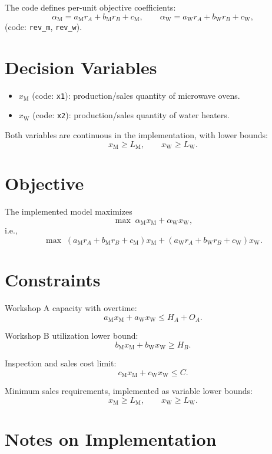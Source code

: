 The code defines per-unit objective coefficients:
\[
\alpha_{\mathrm{M}} = a_{\mathrm{M}} r_A + b_{\mathrm{M}} r_B + c_{\mathrm{M}},
\qquad
\alpha_{\mathrm{W}} = a_{\mathrm{W}} r_A + b_{\mathrm{W}} r_B + c_{\mathrm{W}},
\]
(code: \texttt{rev\_m}, \texttt{rev\_w}).

\section*{Decision Variables}

\begin{itemize}
    \item \(x_{\mathrm{M}}\) (code: \texttt{x1}): production/sales quantity of microwave ovens.
    \item \(x_{\mathrm{W}}\) (code: \texttt{x2}): production/sales quantity of water heaters.
\end{itemize}

Both variables are continuous in the implementation, with lower bounds:
\[
x_{\mathrm{M}} \ge L_{\mathrm{M}}, \qquad x_{\mathrm{W}} \ge L_{\mathrm{W}}.
\]

\section*{Objective}

The implemented model maximizes
\[
\max \; \alpha_{\mathrm{M}} x_{\mathrm{M}} + \alpha_{\mathrm{W}} x_{\mathrm{W}},
\]
i.e.,
\[
\max \; (a_{\mathrm{M}} r_A + b_{\mathrm{M}} r_B + c_{\mathrm{M}}) x_{\mathrm{M}}
      + (a_{\mathrm{W}} r_A + b_{\mathrm{W}} r_B + c_{\mathrm{W}}) x_{\mathrm{W}}.
\]

\section*{Constraints}

Workshop A capacity with overtime:
\[
a_{\mathrm{M}} x_{\mathrm{M}} + a_{\mathrm{W}} x_{\mathrm{W}} \le H_A + O_A.
\]

Workshop B utilization lower bound:
\[
b_{\mathrm{M}} x_{\mathrm{M}} + b_{\mathrm{W}} x_{\mathrm{W}} \ge H_B.
\]

Inspection and sales cost limit:
\[
c_{\mathrm{M}} x_{\mathrm{M}} + c_{\mathrm{W}} x_{\mathrm{W}} \le C.
\]

Minimum sales requirements, implemented as variable lower bounds:
\[
x_{\mathrm{M}} \ge L_{\mathrm{M}},
\qquad
x_{\mathrm{W}} \ge L_{\mathrm{W}}.
\]

\section*{Notes on Implementation}

